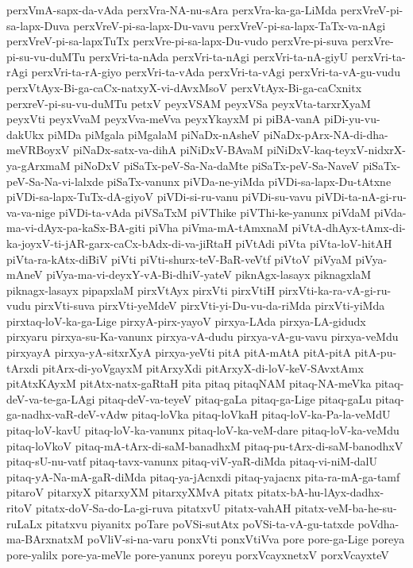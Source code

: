 {perxVmA-sapx-da-vAda
perxVra-NA-nu-sAra
perxVra-ka-ga-LiMda
perxVreV-pi-sa-lapx-Duva
perxVreV-pi-sa-lapx-Du-vavu
perxVreV-pi-sa-lapx-TaTx-va-nAgi
perxVreV-pi-sa-lapxTuTx
perxVre-pi-sa-lapx-Du-vudo
perxVre-pi-suva
perxVre-pi-su-vu-duMTu
perxVri-ta-nAda
perxVri-ta-nAgi
perxVri-ta-nA-giyU
perxVri-ta-rAgi
perxVri-ta-rA-giyo
perxVri-ta-vAda
perxVri-ta-vAgi
perxVri-ta-vA-gu-vudu
perxVtAyx-Bi-ga-caCx-natxyX-vi-dAvxMsoV
perxVtAyx-Bi-ga-caCxnitx
perxreV-pi-su-vu-duMTu
petxV
peyxVSAM
peyxVSa
peyxVta-tarxrXyaM
peyxVti
peyxVvaM
peyxVva-meVva
peyxYkayxM
pi
piBA-vanA
piDi-yu-vu-dakUkx
piMDa
piMgala
piMgalaM
piNaDx-nAsheV
piNaDx-pArx-NA-di-dha-meVRBoyxV
piNaDx-satx-va-dihA
piNiDxV-BAvaM
piNiDxV-kaq-teyxV-nidxrX-ya-gArxmaM
piNoDxV
piSaTx-peV-Sa-Na-daMte
piSaTx-peV-Sa-NaveV
piSaTx-peV-Sa-Na-vi-lalxde
piSaTx-vanunx
piVDa-ne-yiMda
piVDi-sa-lapx-Du-tAtxne
piVDi-sa-lapx-TuTx-dA-giyoV
piVDi-si-ru-vanu
piVDi-su-vavu
piVDi-ta-nA-gi-ru-va-va-nige
piVDi-ta-vAda
piVSaTxM
piVThike
piVThi-ke-yanunx
piVdaM
piVda-ma-vi-dAyx-pa-kaSx-BA-giti
piVha
piVma-mA-tAmxnaM
piVtA-dhAyx-tAmx-di-ka-joyxV-ti-jAR-garx-caCx-bAdx-di-va-jiRtaH
piVtAdi
piVta
piVta-loV-hitAH
piVta-ra-kAtx-diBiV
piVti
piVti-shurx-teV-BaR-veVtf
piVtoV
piVyaM
piVya-mAneV
piVya-ma-vi-deyxY-vA-Bi-dhiV-yateV
piknAgx-lasayx
piknagxlaM
piknagx-lasayx
pipapxlaM
pirxVtAyx
pirxVti
pirxVtiH
pirxVti-ka-ra-vA-gi-ru-vudu
pirxVti-suva
pirxVti-yeMdeV
pirxVti-yi-Du-vu-da-riMda
pirxVti-yiMda
pirxtaq-loV-ka-ga-Lige
pirxyA-pirx-yayoV
pirxya-LAda
pirxya-LA-gidudx
pirxyaru
pirxya-su-Ka-vanunx
pirxya-vA-dudu
pirxya-vA-gu-vavu
pirxya-veMdu
pirxyayA
pirxya-yA-sitxrXyA
pirxya-yeVti
pitA
pitA-mAtA
pitA-pitA
pitA-pu-tArxdi
pitArx-di-yoVgayxM
pitArxyXdi
pitArxyX-di-loV-keV-SAvxtAmx
pitAtxKAyxM
pitAtx-natx-gaRtaH
pita
pitaq
pitaqNAM
pitaq-NA-meVka
pitaq-deV-va-te-ga-LAgi
pitaq-deV-va-teyeV
pitaq-gaLa
pitaq-ga-Lige
pitaq-gaLu
pitaq-ga-nadhx-vaR-deV-vAdw
pitaq-loVka
pitaq-loVkaH
pitaq-loV-ka-Pa-la-veMdU
pitaq-loV-kavU
pitaq-loV-ka-vanunx
pitaq-loV-ka-veM-dare
pitaq-loV-ka-veMdu
pitaq-loVkoV
pitaq-mA-tArx-di-saM-banadhxM
pitaq-pu-tArx-di-saM-banodhxV
pitaq-sU-nu-vatf
pitaq-tavx-vanunx
pitaq-viV-yaR-diMda
pitaq-vi-niM-dalU
pitaq-yA-Na-mA-gaR-diMda
pitaq-ya-jAcnxdi
pitaq-yajacnx
pita-ra-mA-ga-tamf
pitaroV
pitarxyX
pitarxyXM
pitarxyXMvA
pitatx
pitatx-bA-hu-lAyx-dadhx-ritoV
pitatx-doV-Sa-do-La-gi-ruva
pitatxvU
pitatx-vahAH
pitatx-veM-ba-he-su-ruLaLx
pitatxvu
piyanitx
poTare
poVSi-sutAtx
poVSi-ta-vA-gu-tatxde
poVdha-ma-BArxnatxM
poVliV-si-na-varu
ponxVti
ponxVtiVva
pore
pore-ga-Lige
poreya
pore-yalilx
pore-ya-meVle
pore-yanunx
poreyu
porxVcayxnetxV
porxVcayxteV
}
